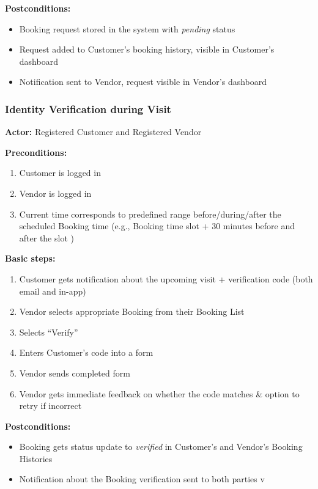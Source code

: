 \documentclass[11pt,a4paper]{article}
\begin{document}
\noindent \textbf{Postconditions:}
\begin{itemize}
  \item Booking request stored in the system with \textit{pending} status
  \item Request added to Customer's booking history, visible in
    Customer's dashboard
  \item Notification sent to Vendor, request visible in Vendor's dashboard
\end{itemize}

\subsubsection{Identity Verification during Visit}

\textbf{Actor:} Registered Customer and Registered Vendor

\noindent \textbf{Preconditions:}
\begin{enumerate}
  \item Customer is logged in
  \item Vendor is logged in
  \item Current time corresponds to predefined range
    before/during/after the scheduled Booking time (e.g., Booking
    time slot + 30 minutes before and after the slot )
\end{enumerate}

\noindent \textbf{Basic steps:}
\begin{enumerate}
  \item Customer gets notification about the upcoming visit +
    verification code (both email and in-app)
  \item Vendor selects appropriate Booking from their Booking List
  \item Selects ``Verify''
  \item Enters Customer's code into a form
  \item Vendor sends completed form
  \item Vendor gets immediate feedback on whether the code matches \&
    option to retry if incorrect
\end{enumerate}

\noindent \textbf{Postconditions:}
\begin{itemize}
  \item Booking gets status update to \textit{verified} in Customer's
    and Vendor's Booking Histories
  \item Notification about the Booking verification sent to both parties
    v
\end{itemize}
\end{document}
